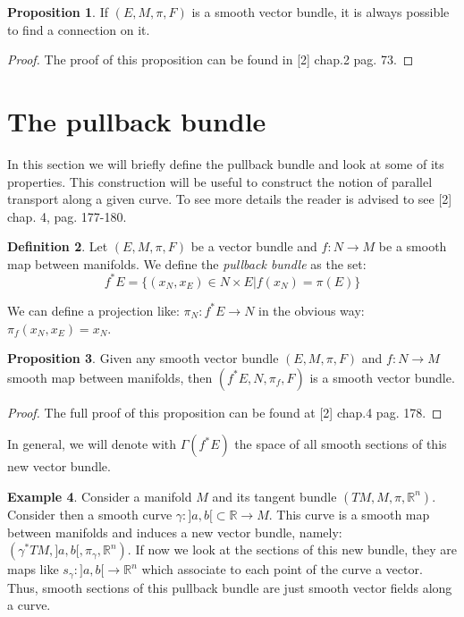 \documentclass[12pt,a4paper]{report}
\theoremstyle{definition}
\newtheorem{Def}{Definition}[chapter]
\theoremstyle{Theorem}
\newtheorem{Prop}[Def]{Proposition}
\theoremstyle{definition}
\newtheorem{Ex}[Def]{Example}
\theoremstyle{definition}
\begin{document}
	\begin{Prop}
		If $(E,M,\pi,F)$ is a smooth vector bundle, it is always possible to find a connection on it.
	\end{Prop}
	\begin{proof}
		The proof of this proposition can be found in [2] chap.2 pag. 73.
	\end{proof}
	\section{The pullback bundle}
	In this section we will briefly define the pullback bundle and look at some of its properties. This construction will be useful to construct the notion of parallel transport along a given curve. To see more details the reader is advised to see [2] chap. 4, pag. 177-180.
	\begin{Def}
		Let $(E,M,\pi,F)$ be a vector bundle and $f:N\rightarrow M$ be a smooth map between manifolds. We define the \textit{pullback bundle} as the set:
		$$f^*E=\{(x_N,x_E)\in N\times E|f(x_N)=\pi(E)\}$$
	\end{Def}
	We can define a projection like: $\pi_N:f^*E\rightarrow N$ in the obvious way: $\pi_f(x_N,x_E)=x_N$. 
	\begin{Prop}
		Given any smooth vector bundle $(E,M,\pi,F)$ and $f:N\rightarrow M$ smooth map between manifolds, then $(f^*E,N,\pi_f,F)$ is a smooth vector bundle.
	\end{Prop}
	\begin{proof}
		The full proof of this proposition can be found at [2] chap.4 pag. 178.
	\end{proof}
	In general, we will denote with $\Gamma(f^*E)$ the space of all smooth sections of this new vector bundle.
	\begin{Ex}
		Consider a manifold $M$ and its tangent bundle $(TM,M,\pi,\mathbb{R}^n)$. Consider then a smooth curve $\gamma:]a,b[\subset \mathbb{R}\rightarrow M$. This curve is a smooth map between manifolds and induces a new vector bundle, namely: $(\gamma^*TM,]a,b[,\pi_\gamma,\mathbb{R}^n)$. If now we look at the sections of this new bundle, they are maps like $s_\gamma:]a,b[\rightarrow\mathbb{R}^n$ which associate to each point of the curve a vector. Thus, smooth sections of this pullback bundle are just smooth vector fields along a curve.
	\end{Ex}
\end{document}
